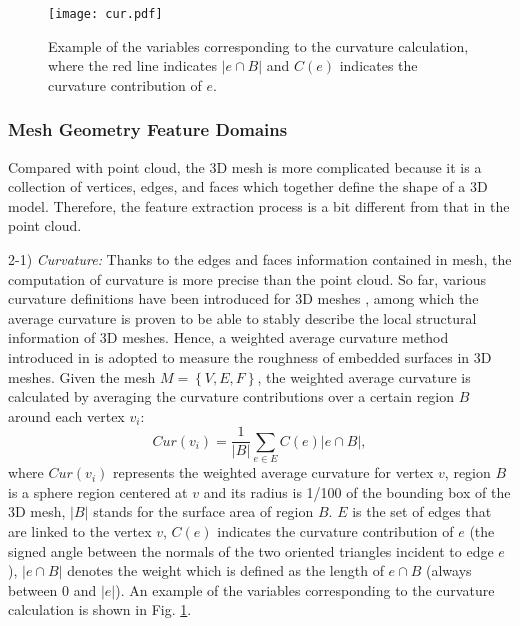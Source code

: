 \documentclass[lettersize,journal]{IEEEtran}
\begin{document}
\begin{figure}[t]
    \centering
    \texttt{[image: cur.pdf]}
    \caption{Example of the variables corresponding to the curvature calculation, where the red line indicates $|e \cap B|$ and $C(e)$ indicates the curvature contribution of $e$.}
    \label{fig:variables}
\end{figure}








\subsubsection{ Mesh Geometry Feature Domains}
\label{sec:mqa}
Compared with point cloud, the 3D mesh is more complicated because it is a collection of vertices, edges, and faces which together define the shape of a 3D model. Therefore, the feature extraction process is a bit different from that in the point cloud.

2-1) \textit{Curvature:}
Thanks to the edges and faces information contained in mesh, the computation of curvature is more precise than the point cloud. So far, various curvature definitions have been introduced for 3D meshes \cite{gaussian_curvature} \cite{average_curvature}, among which the average curvature is proven to be able to stably describe the local structural information of 3D meshes. Hence, a weighted average curvature method introduced in \cite{average_curvature} is adopted to measure the roughness of embedded surfaces in 3D meshes. Given the mesh $M=\left\{V,E,F\right\}$, the weighted average curvature is calculated by averaging the curvature contributions over a certain region $B$ around each vertex $v_{i}$:
\begin{equation}
Cur(v_{i})=\frac{1}{|B|} \sum_{e \in E} C(e)|e \cap B|,
\end{equation}
where $Cur(v_{i})$ represents the weighted average curvature for vertex $v$, region $B$ is a sphere region centered at $v$ and its radius is 1/100 of the bounding box of the 3D mesh, $|B|$ stands for the surface area of region $B$. $E$ is the set of edges that are linked to the vertex $v$, $C(e)$ indicates the curvature contribution of $e$ (the signed angle between the normals of the two oriented triangles incident to edge $e$), $|e \cap B|$ denotes the weight which is defined as the length of $e \cap B$ (always between 0 and $|e|$). An example of the variables corresponding to the curvature calculation is shown in Fig. \ref{fig:variables}.
\end{document}
